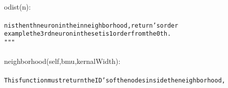 {{\begin{tabbing}
\\
\hspace{6pt}odist(n):\\
\\
{\texttt{\hspace{48pt}n\hspace{6pt}is\hspace{6pt}the\hspace{6pt}nth\hspace{6pt}neuron\hspace{6pt}in\hspace{6pt}the\hspace{6pt}in\hspace{6pt}neighborhood,\hspace{6pt}return{'}s\hspace{6pt}order}}\\
{\texttt{\hspace{48pt}example\hspace{6pt}the\hspace{6pt}3rd\hspace{6pt}neuron\hspace{6pt}in\hspace{6pt}the\hspace{6pt}set\hspace{6pt}is\hspace{6pt}1\hspace{6pt}order\hspace{6pt}from\hspace{6pt}the\hspace{6pt}0th.}}\\
{\texttt{\hspace{48pt}\string"}}{\texttt{\string"\string"}}\\
\\
\hspace{6pt}neighborhood(self,bmu,kernalWidth):\\
\\
{\texttt{\hspace{48pt}This\hspace{6pt}function\hspace{6pt}must\hspace{6pt}return\hspace{6pt}the\hspace{6pt}ID{'}s\hspace{6pt}of\hspace{6pt}the\hspace{6pt}nodes\hspace{6pt}inside\hspace{6pt}the\hspace{6pt}neighborhood,\hspace{6pt}}}\\

\end{tabbing}}}
